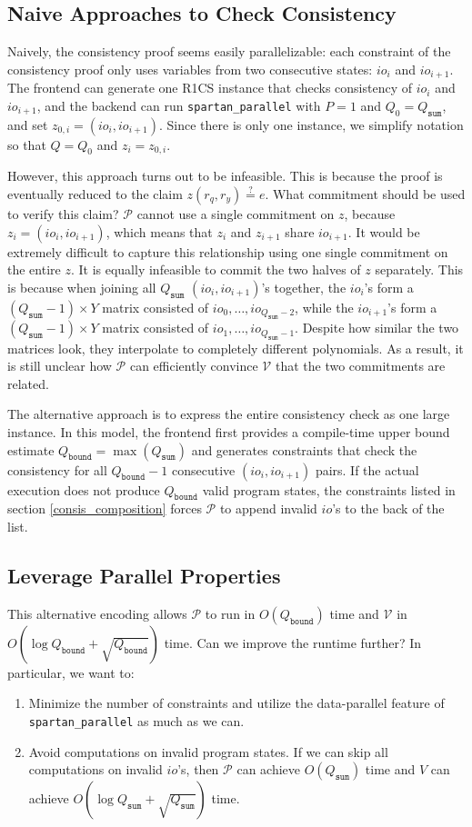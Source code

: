 \documentclass{article}
\newcommand{\code}{\texttt}
\newcommand{\Qbound}{Q_{\mathtt{bound}}}
\newcommand{\Qsum}{Q_{\mathtt{sum}}}
\renewcommand{\P}{\mathcal{P}}
\newcommand{\V}{\mathcal{V}}
\newcommand{\eqq}{\stackrel{?}{=}}
\begin{document}
\subsection{Naive Approaches to Check Consistency}

Naively, the consistency proof seems easily parallelizable: each constraint of the consistency proof only uses variables from two consecutive states: $io_i$ and $io_{i + 1}$. The frontend can generate one R1CS instance that checks consistency of $io_i$ and $io_{i + 1}$, and the backend can run \code{spartan\_parallel} with $P = 1$ and $Q_0 = \Qsum$, and set $z_{0, i} = (io_i, io_{i + 1})$. Since there is only one instance, we simplify notation so that $Q = Q_0$ and $z_i = z_{0, i}$.

However, this approach turns out to be infeasible. This is because the proof is eventually reduced to the claim $z(r_q, r_y) \eqq e$. What commitment should be used to verify this claim? $\P$ cannot use a single commitment on $z$, because $z_{i} = (io_i, io_{i + 1})$, which means that $z_i$ and $z_{i+1}$ share $io_{i + 1}$. It would be extremely difficult to capture this relationship using one single commitment on the entire $z$. It is equally infeasible to commit the two halves of $z$ separately. This is because when joining all $\Qsum$ $(io_i, io_{i + 1})$'s together, the $io_i$'s form a $(\Qsum - 1)\times Y$ matrix consisted of $io_0, \dots, io_{\Qsum - 2}$, while the $io_{i + 1}$'s form a $(\Qsum - 1)\times Y$ matrix consisted of $io_1, \dots, io_{\Qsum - 1}$. Despite how similar the two matrices look, they interpolate to completely different polynomials. As a result, it is still unclear how $\P$ can efficiently convince $\V$ that the two commitments are related.
 
The alternative approach is to express the entire consistency check as one large instance. In this model, the frontend first provides a compile-time upper bound estimate $\Qbound = \max(\Qsum)$ and generates constraints that check the consistency for all $\Qbound - 1$ consecutive $(io_i, io_{i + 1})$ pairs. If the actual execution does not produce $\Qbound$ valid program states, the constraints listed in section \ref{consis_composition} forces $\P$ to append invalid $io$'s to the back of the list.

\subsection{Leverage Parallel Properties}

This alternative encoding allows $\P$ to run in $O(\Qbound)$ time and $\V$ in $O(\log \Qbound + \sqrt{\Qbound})$ time. Can we improve the runtime further? In particular, we want to:
\begin{enumerate}
    \item \label{impr:min_cons} Minimize the number of constraints and utilize the data-parallel feature of \code{spartan\_parallel} as much as we can.
    \item \label{impr:min_comp} Avoid computations on invalid program states. If we can skip all computations on invalid $io$'s, then $\P$ can achieve $O(\Qsum)$ time and $V$ can achieve $O(\log\Qsum + \sqrt{\Qsum})$ time.
\end{enumerate}
\end{document}
